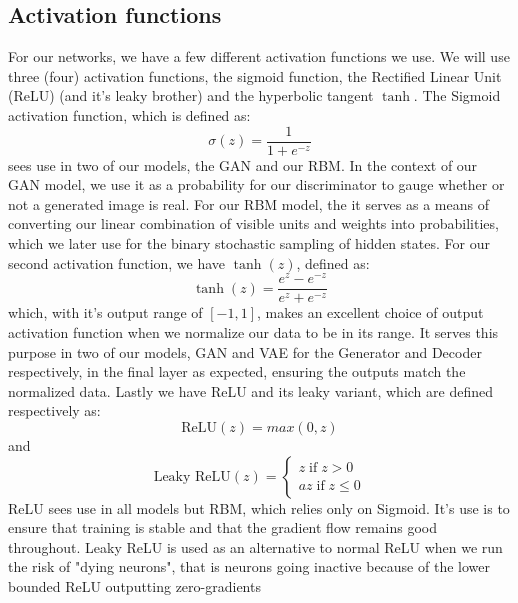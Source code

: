 \documentclass{article}
\begin{document}
\subsection{Activation functions} \label{acti}
For our networks, we have a few different activation functions we use. We will use three (four) activation functions, the sigmoid function, the Rectified Linear Unit (ReLU) (and it's leaky brother) and the hyperbolic tangent $\tanh$.
\newline
The Sigmoid activation function, which is defined as:
\begin{equation} \label{sigm}
    \sigma(z) = \frac{1}{1 + e^{-z}}
\end{equation}
sees use in two of our models, the GAN and our RBM. In the context of our GAN model, we use it as a probability for our discriminator to gauge whether or not a generated image is real. For our RBM model, the it serves as a means of converting our linear combination of visible units and weights into probabilities, which we later use for the binary stochastic sampling of hidden states.
\newline
For our second activation function, we have $\tanh(z)$, defined as:
\begin{equation}
    \tanh(z) = \frac{e^{z} - e^{-z}}{e^z +e^{-z}}
\end{equation}
which, with it's output range of $[-1, 1]$, makes an excellent choice of output activation function when we normalize our data to be in its range. It serves this purpose in two of our models, GAN and VAE for the Generator and Decoder respectively, in the final layer as expected, ensuring the outputs match the normalized data.
\newline
Lastly we have ReLU and its leaky variant, which are defined respectively as:
\begin{equation}
    \text{ReLU}(z) = max(0, z)
\end{equation}
and
\begin{equation}
    \text{Leaky ReLU}(z) = \begin{cases}
        z \; \text{if} \; z>0 \\
        az \; \text{if} \; z\leq 0
    \end{cases}
\end{equation}
ReLU sees use in all models but RBM, which relies only on Sigmoid. It's use is to ensure that training is stable and that the gradient flow remains good throughout. Leaky ReLU is used as an alternative to normal ReLU when we run the risk of "dying neurons", that is neurons going inactive because of the lower bounded ReLU outputting zero-gradients
\end{document}
